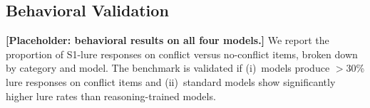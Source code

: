 \subsection{Behavioral Validation}

\textbf{[Placeholder: behavioral results on all four models.]}  We report the
proportion of S1-lure responses on conflict versus no-conflict items, broken
down by category and model.  The benchmark is validated if (i)~models produce
$>30$\% lure responses on conflict items and (ii)~standard models show
significantly higher lure rates than reasoning-trained models.
